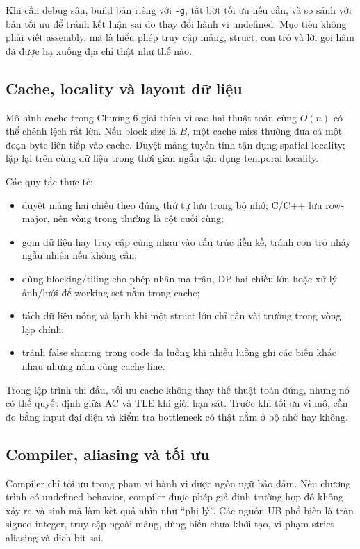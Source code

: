 \documentclass[11pt]{article}
\begin{document}
Khi cần debug sâu, build bản riêng với \texttt{-g}, tắt bớt tối ưu nếu cần, và
so sánh với bản tối ưu để tránh kết luận sai do thay đổi hành vi undefined.
Mục tiêu không phải viết assembly, mà là hiểu phép truy cập mảng, struct, con
trỏ và lời gọi hàm đã được hạ xuống địa chỉ thật như thế nào.

\subsection{Cache, locality và layout dữ liệu}

Mô hình cache trong Chương 6 giải thích vì sao hai thuật toán cùng \(O(n)\) có
thể chênh lệch rất lớn. Nếu block size là \(B\), một cache miss thường đưa cả
một đoạn byte liên tiếp vào cache. Duyệt mảng tuyến tính tận dụng spatial
locality; lặp lại trên cùng dữ liệu trong thời gian ngắn tận dụng temporal
locality.

Các quy tắc thực tế:
\begin{itemize}
  \item duyệt mảng hai chiều theo đúng thứ tự lưu trong bộ nhớ; C/C++ lưu
        row-major, nên vòng trong thường là cột cuối cùng;
  \item gom dữ liệu hay truy cập cùng nhau vào cấu trúc liền kề, tránh con trỏ
        nhảy ngẫu nhiên nếu không cần;
  \item dùng blocking/tiling cho phép nhân ma trận, DP hai chiều lớn hoặc xử lý
        ảnh/lưới để working set nằm trong cache;
  \item tách dữ liệu nóng và lạnh khi một struct lớn chỉ cần vài trường trong
        vòng lặp chính;
  \item tránh false sharing trong code đa luồng khi nhiều luồng ghi các biến
        khác nhau nhưng nằm cùng cache line.
\end{itemize}

Trong lập trình thi đấu, tối ưu cache không thay thế thuật toán đúng, nhưng nó
có thể quyết định giữa AC và TLE khi giới hạn sát. Trước khi tối ưu vi mô, cần
đo bằng input đại diện và kiểm tra bottleneck có thật nằm ở bộ nhớ hay không.

\subsection{Compiler, aliasing và tối ưu}

Compiler chỉ tối ưu trong phạm vi hành vi được ngôn ngữ bảo đảm. Nếu chương
trình có undefined behavior, compiler được phép giả định trường hợp đó không
xảy ra và sinh mã làm kết quả nhìn như ``phi lý''. Các nguồn UB phổ biến là
tràn signed integer, truy cập ngoài mảng, dùng biến chưa khởi tạo, vi phạm
strict aliasing và dịch bit sai.
\end{document}
